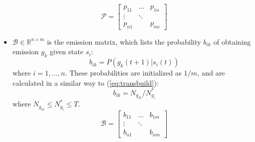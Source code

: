 \documentclass[letterpaper, 10 pt, conference]{ieeeconf}  %
\begin{document}
\begin{itemize}
        \begin{equation}
            \mathcal{P} = 
                    \begin{bmatrix}
                        p_{11} & \dots & p_{1n} \\
                        \vdots & \ddots & \\
                        p_{n1} &    & p_{nn}
                    \end{bmatrix}
        \end{equation}
    \item $\mathcal{B}\in\mathbb{R}^{n\times m}$ is the emission matrix, which lists the probability $b_{ik}$ of obtaining emission $g_k$ given state $s_i$:
        \begin{equation} \label{eq:obsref}
            b_{ik} = P(g_k(t+1) \vert s_i(t))
        \end{equation}
        where $i = 1,\ldots,n$. These probabilities are initialized as $1/m$, and are calculated in a similar way to (\ref{eq:transbuild}):
        \begin{equation} \label{eq:obsbuild}
            b_{ik} = N_{g_{ik}}/N^*_{g_{i}}
        \end{equation} 
        where $N_{g_{ik}} \leq N^*_{g_{i}} \leq T$.
        \begin{equation}
            \mathcal{B} = 
                    \begin{bmatrix}
                        b_{11} & \dots & b_{1m} \\
                        \vdots & \ddots & \\
                        b_{n1} &    & b_{nm}
                    \end{bmatrix}
        \end{equation}
\end{itemize}
\end{document}
